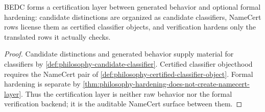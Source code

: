 \begin{theorem}
\label{thm:philosophy-certification-layer-theorem}
BEDC forms a certification layer between generated behavior and optional
formal hardening: candidate distinctions are organized as candidate
classifiers, NameCert rows license them as certified classifier objects,
and verification hardens only the translated rows it actually checks.
\end{theorem}
\begin{proof}
Candidate distinctions and generated behavior supply material for
classifiers by \autoref{def:philosophy-candidate-classifier}. Certified
classifier objecthood requires the NameCert pair of
\autoref{def:philosophy-certified-classifier-object}. Formal hardening is
separate by \autoref{thm:philosophy-hardening-does-not-create-namecert-layer}.
Thus the certification layer is neither raw behavior nor the formal
verification backend; it is the auditable NameCert surface between them.
\end{proof}

